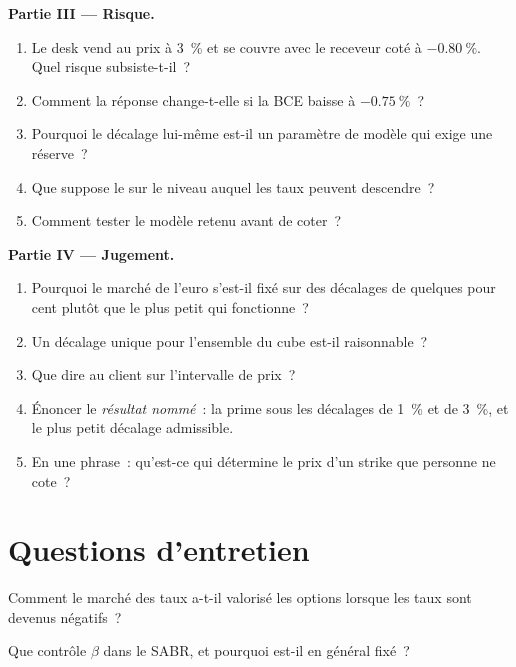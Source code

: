 \begin{problem}
\medskip\noindent\textbf{Partie III --- Risque.}
\begin{enumerate}[resume]
\item Le desk vend au prix à 3~\% et se couvre avec le
receveur coté à $-0.80~\%$. Quel risque subsiste-t-il~?
\item Comment la réponse change-t-elle si la BCE baisse à $-0.75~\%$~?
\item Pourquoi le décalage lui-même est-il un paramètre de modèle qui exige une réserve~?
\item Que suppose le  sur le niveau auquel les taux peuvent descendre~?
\item Comment tester le modèle retenu avant de coter~?
\end{enumerate}

\medskip\noindent\textbf{Partie IV --- Jugement.}
\begin{enumerate}[resume]
\item Pourquoi le marché de l'euro s'est-il fixé sur des décalages de quelques pour cent plutôt que
le plus petit qui fonctionne~?
\item Un décalage unique pour l'ensemble du cube est-il raisonnable~?
\item Que dire au client sur l'intervalle de prix~?
\item Énoncer le \emph{résultat nommé}~: la prime sous les décalages de 1~\% et de 3~\%, et
le plus petit décalage admissible.
\item En une phrase~: qu'est-ce qui détermine le prix d'un strike que personne ne cote~?
\end{enumerate}
\end{problem}

\section{Questions d'entretien}

\begin{interviewq}\label{iq:rc:sabr-in-rates-and-the-volatility-cube:1}
Comment le marché des taux a-t-il valorisé les options lorsque les taux sont devenus négatifs~?
\end{interviewq}

\begin{interviewq}\label{iq:rc:sabr-in-rates-and-the-volatility-cube:2}
Que contrôle $\beta$ dans le SABR, et pourquoi est-il en général fixé~?
\end{interviewq}

